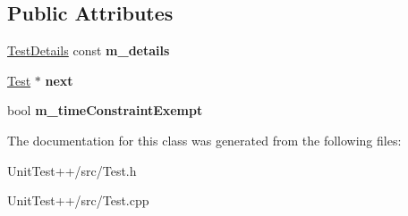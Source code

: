 \subsection*{Public Attributes}
\begin{DoxyCompactItemize}
\item 
\hypertarget{classUnitTest_1_1Test_ae990920e048b41738394132fe985c452}{\hyperlink{classUnitTest_1_1TestDetails}{Test\-Details} const {\bfseries m\-\_\-details}}\label{classUnitTest_1_1Test_ae990920e048b41738394132fe985c452}

\item 
\hypertarget{classUnitTest_1_1Test_af14837fa08df9cdedb560b4deadec8a4}{\hyperlink{classUnitTest_1_1Test}{Test} $\ast$ {\bfseries next}}\label{classUnitTest_1_1Test_af14837fa08df9cdedb560b4deadec8a4}

\item 
\hypertarget{classUnitTest_1_1Test_aa9da2047fed156c74d97c89c4beb7663}{bool {\bfseries m\-\_\-time\-Constraint\-Exempt}}\label{classUnitTest_1_1Test_aa9da2047fed156c74d97c89c4beb7663}

\end{DoxyCompactItemize}


The documentation for this class was generated from the following files\-:\begin{DoxyCompactItemize}
\item 
Unit\-Test++/src/Test.\-h\item 
Unit\-Test++/src/Test.\-cpp\end{DoxyCompactItemize}
